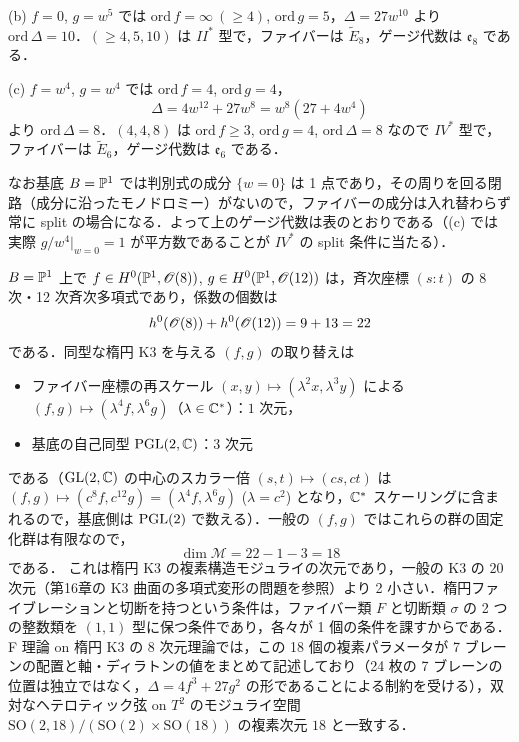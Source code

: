 (b) $f=0$, $g=w^5$ では $\mathrm{ord}\,f=\infty\ (\ge4)$, $\mathrm{ord}\,g=5$，$\Delta=27w^{10}$ より $\mathrm{ord}\,\Delta=10$．$(\ge4,5,10)$ は $II^*$ 型で，ファイバーは $\tilde E_8$，ゲージ代数は $\mathfrak{e}_8$ である．

(c) $f=w^4$, $g=w^4$ では $\mathrm{ord}\,f=4$, $\mathrm{ord}\,g=4$，
\[
\Delta=4w^{12}+27w^8=w^8(27+4w^4)
\]
より $\mathrm{ord}\,\Delta=8$．$(4,4,8)$ は $\mathrm{ord}\,f\ge3$, $\mathrm{ord}\,g=4$, $\mathrm{ord}\,\Delta=8$ なので $IV^*$ 型で，ファイバーは $\tilde E_6$，ゲージ代数は $\mathfrak{e}_6$ である．

なお基底 $B=\mathbb{P}^1$ では判別式の成分 $\{w=0\}$ は 1 点であり，その周りを回る閉路（成分に沿ったモノドロミー）がないので，ファイバーの成分は入れ替わらず常に split の場合になる．よって上のゲージ代数は表のとおりである（(c) では実際 $g/w^4|_{w=0}=1$ が平方数であることが $IV^*$ の split 条件に当たる）．

$B=\mathbb{P}^1$ 上で $f\in H^0(\mathbb{P}^1,\mathscr{O}(8))$, $g\in H^0(\mathbb{P}^1,\mathscr{O}(12))$ は，斉次座標 $(s:t)$ の 8 次・12 次斉次多項式であり，係数の個数は
\[
h^0(\mathscr{O}(8))+h^0(\mathscr{O}(12))=9+13=22
\]
である．同型な楕円 K3 を与える $(f,g)$ の取り替えは
\begin{itemize}
\item ファイバー座標の再スケール $(x,y)\mapsto(\lambda^2x,\lambda^3y)$ による $(f,g)\mapsto(\lambda^4f,\lambda^6g)$（$\lambda\in\mathbb{C}^*$）：$1$ 次元，
\item 基底の自己同型 $\operatorname{PGL}(2,\mathbb{C})$：$3$ 次元
\end{itemize}
である（$\operatorname{GL}(2,\mathbb{C})$ の中心のスカラー倍 $(s,t)\mapsto(cs,ct)$ は $(f,g)\mapsto(c^8f,c^{12}g)=(\lambda^4f,\lambda^6g)$ ($\lambda=c^2$) となり，$\mathbb{C}^*$ スケーリングに含まれるので，基底側は $\operatorname{PGL}(2)$ で数える）．一般の $(f,g)$ ではこれらの群の固定化群は有限なので，
\[
\dim\mathcal{M}=22-1-3=18
\]
である．
これは楕円 K3 の複素構造モジュライの次元であり，一般の K3 の $20$ 次元（第16章の K3 曲面の多項式変形の問題を参照）より 2 小さい．楕円ファイブレーションと切断を持つという条件は，ファイバー類 $F$ と切断類 $\sigma$ の 2 つの整数類を $(1,1)$ 型に保つ条件であり，各々が 1 個の条件を課すからである．F 理論 on 楕円 K3 の 8 次元理論では，この 18 個の複素パラメータが 7 ブレーンの配置と軸・ディラトンの値をまとめて記述しており（24 枚の 7 ブレーンの位置は独立ではなく，$\Delta=4f^3+27g^2$ の形であることによる制約を受ける），双対なヘテロティック弦 on $T^2$ のモジュライ空間 $\mathrm{SO}(2,18)/(\mathrm{SO}(2)\times\mathrm{SO}(18))$ の複素次元 $18$ と一致する．

